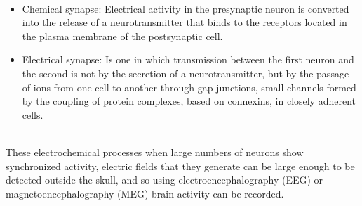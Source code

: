 \\
\begin{itemize}
  \item	Chemical synapse: Electrical activity in the presynaptic neuron is converted into the release of a neurotransmitter that binds to the receptors located in the plasma membrane of the postsynaptic cell.
  \item	Electrical synapse: Is one in which transmission between the first neuron and the second is not by the secretion of a neurotransmitter, but by the passage of ions from one cell to another through gap junctions, small channels formed by the coupling of protein complexes, based on connexins, in closely adherent cells.
\end{itemize}

\leavevmode\\
These electrochemical processes when large numbers of neurons show synchronized activity, electric fields that they generate can be large enough to be detected outside the skull, and so using electroencephalography (EEG) or magnetoencephalography (MEG) brain activity can be recorded.
\\

